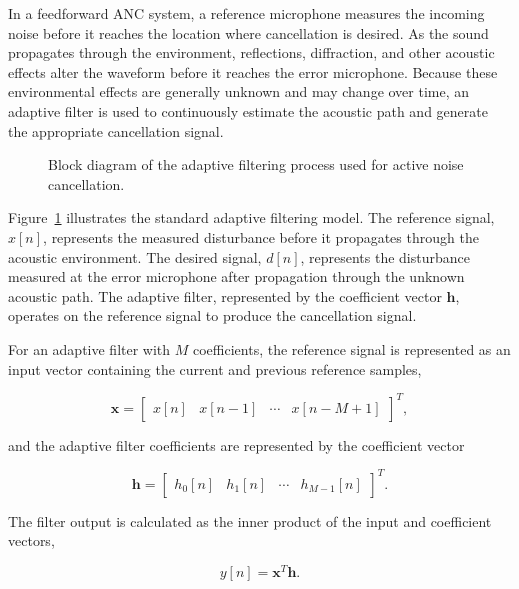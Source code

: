 In a feedforward ANC system, a reference microphone measures the incoming noise before it reaches the location where cancellation is desired. As the sound propagates through the environment, reflections, diffraction, and other acoustic effects alter the waveform before it reaches the error microphone. Because these environmental effects are generally unknown and may change over time, an adaptive filter is used to continuously estimate the acoustic path and generate the appropriate cancellation signal.

\begin{figure}[H]
\centering
\resizebox{0.8\textwidth}{!}{  }
\caption{Block diagram of the adaptive filtering process used for active noise cancellation.}
\label{fig:adaptive_diagram}
\end{figure}

Figure~\ref{fig:adaptive_diagram} illustrates the standard adaptive filtering model. The reference signal, $x[n]$, represents the measured disturbance before it propagates through the acoustic environment. The desired signal, $d[n]$, represents the disturbance measured at the error microphone after propagation through the unknown acoustic path. The adaptive filter, represented by the coefficient vector $\mathbf{h}$, operates on the reference signal to produce the cancellation signal.

For an adaptive filter with $M$ coefficients, the reference signal is represented as an input vector containing the current and previous reference samples,

\begin{equation}
\mathbf{x} =
\begin{bmatrix}
x[n] & x[n-1] & \cdots & x[n-M+1]
\end{bmatrix}^{T},
\end{equation}

and the adaptive filter coefficients are represented by the coefficient vector

\begin{equation}
\mathbf{h} =
\begin{bmatrix}
h_0[n] & h_1[n] & \cdots & h_{M-1}[n]
\end{bmatrix}^{T}.
\end{equation}

The filter output is calculated as the inner product of the input and coefficient vectors,

\begin{equation}
y[n] = \mathbf{x}^{T}\mathbf{h}.
\end{equation}

